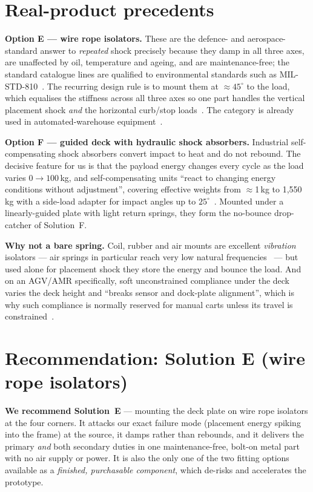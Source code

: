 \documentclass[11pt,a4paper]{article}
\begin{document}
\section{Real-product precedents}
\textbf{Option E --- wire rope isolators.}
These are the defence- and aerospace-standard answer to \emph{repeated} shock precisely because they
damp in all three axes, are unaffected by oil, temperature and ageing, and are maintenance-free; the
standard catalogue lines are qualified to environmental standards such as MIL-STD-810~\cite{enidine}.
The recurring design rule is to mount them at $\approx 45^{\circ}$ to the load, which equalises the
stiffness across all three axes so one part handles the vertical placement shock \emph{and} the
horizontal curb/stop loads~\cite{uspto45a,uspto45b}. The category is already used in automated-warehouse
equipment~\cite{enidine}.

\textbf{Option F --- guided deck with hydraulic shock absorbers.}
Industrial self-compensating shock absorbers convert impact to heat and do not rebound. The decisive
feature for us is that the payload energy changes every cycle as the load varies $0\rightarrow100$\,kg,
and self-compensating units ``react to changing energy conditions without adjustment'', covering
effective weights from $\approx$1\,kg to 1{,}550\,kg with a side-load adapter for impact angles up to
$25^{\circ}$~\cite{acesc,aceheavy}. Mounted under a linearly-guided plate with light return springs,
they form the no-bounce drop-catcher of Solution~F.

\textbf{Why not a bare spring.}
Coil, rubber and air mounts are excellent \emph{vibration} isolators --- air springs in particular reach
very low natural frequencies~\cite{firestone,mason} --- but used alone for placement shock they store the
energy and bounce the load. And on an AGV/AMR specifically, soft unconstrained compliance under the deck
varies the deck height and ``breaks sensor and dock-plate alignment'', which is why such compliance is
normally reserved for manual carts unless its travel is constrained~\cite{casterhq}.

\section{Recommendation: Solution E (wire rope isolators)}
\textbf{We recommend Solution~E} --- mounting the deck plate on wire rope isolators at the four corners.
It attacks our exact failure mode (placement energy spiking into the frame) at the source, it damps
rather than rebounds, and it delivers the primary \emph{and} both secondary duties in one
maintenance-free, bolt-on metal part with no air supply or power. It is also the only one of the two
fitting options available as a \emph{finished, purchasable component}, which de-risks and accelerates the
prototype.
\end{document}
